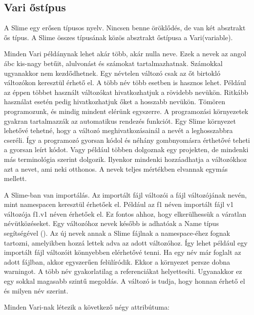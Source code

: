 \subsection{Vari őstípus}
\label{sec:SVariSuper}
A Slime egy erősen típusos nyelv.
Nincsen benne öröklődés, de van két absztrakt ős típus.
A Slime összes típusának közös absztrakt őstípusa a Vari(variable).

Minden Vari példánynak lehet akár több, akár nulla neve.
Ezek a nevek az angol ábc kis-nagy betűit, alulvonást és számokat tartalmazhatnak. 
Számokkal ugyanakkor nem kezdődhetnek.
Egy névtelen változó csak az őt birtokló változókon keresztül érhető el.
A több név több esetben is hasznos lehet.
Például az éppen többet használt változókat hivatkozhatjuk a rövidebb nevükön.
Ritkább használat esetén pedig hivatkozhatjuk őket a hosszabb nevükön.
Tömören programozunk, és mindig mindent elérünk egyszerre.
A programozási környezetek gyakran tartalmazzák az automatikus rendezés funkciót.
Egy Slime környezet lehetővé tehetné, hogy a változó meghivatkozásainál a nevét a leghosszabbra cseréli.
Így a programozó gyorsan kódol és néhány gombnyomásra érthetővé teheti a gyorsan leírt kódot.
Vagy például többen dolgoznak egy projekten, de mindenki más terminológia szerint dolgozik.
Ilyenkor mindenki hozzáadhatja a változókhoz azt a nevet, ami neki otthonos.
A nevek teljes mértékben elvannak egymás mellett.

A Slime-ban van importálás.
Az importált fájl változói a fájl változójának nevén, mint namespacen keresztül érhetőek el.
Például az f1 néven importált fájl v1 változója f1.v1 néven érhetőek el.
Ez fontos ahhoz, hogy elkerülhessük a váratlan névütközéseket.
Egy változóhoz nevek később is adhatóak a Name típus segítségével ().
Az új nevek annak a Slime fájlnak a namespace-éhez fognak tartozni, amelyikben hozzá lettek adva az adott változóhoz. 
Így lehet például egy importált fájl változóit könnyebben elérhetővé tenni.
Ha egy név már foglalt az adott fájlban, akkor egyszerűen felülíródik.
Ekkor a környezet persze dobna warningot.
A több név gyakorlatilag a referenciákat helyettesíti.
Ugyanakkor ez egy sokkal magasabb szintű megoldás.
A változó is tudja, hogy honnan érhető el és milyen név szerint.

Minden Vari-nak létezik a következő négy attribútuma:

